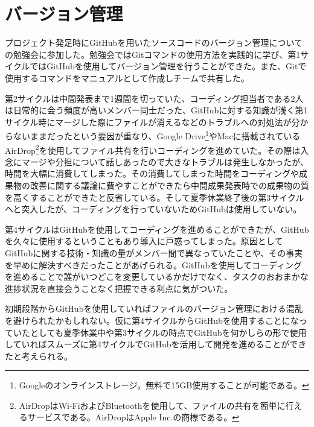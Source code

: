 \section{バージョン管理}
プロジェクト発足時にGitHubを用いたソースコードのバージョン管理についての勉強会に参加した。勉強会ではGitコマンドの使用方法を実践的に学び、第1サイクルではGitHubを使用してバージョン管理を行うことができた。また、Gitで使用するコマンドをマニュアルとして作成しチームで共有した。
\par 第2サイクルは中間発表まで1週間を切っていた、コーディング担当者である2人は日常的に会う頻度が高いメンバー同士だった、GitHubに対する知識が浅く第1サイクル時にマージした際にファイルが消えるなどのトラブルへの対処法が分からないままだったという要因が重なり、Google Drive\footnote{Googleのオンラインストレージ。無料で15GB使用することが可能である。}やMacに搭載されているAirDrop\footnote{AirDropはWi-FiおよびBluetoothを使用して、ファイルの共有を簡単に行えるサービスである。AirDropはApple Inc.の商標である。}を使用してファイル共有を行いコーディングを進めていた。その際は入念にマージや分担について話しあったので大きなトラブルは発生しなかったが、時間を大幅に消費してしまった。その消費してしまった時間をコーディングや成果物の改善に関する議論に費やすことができたら中間成果発表時での成果物の質を高くすることができたと反省している。そして夏季休業終了後の第3サイクルへと突入したが、コーディングを行っていないためGitHubは使用していない。
\par 第4サイクルはGitHubを使用してコーディングを進めることができたが、GitHubを久々に使用するということもあり導入に戸惑ってしまった。原因としてGitHubに関する技術・知識の量がメンバー間で異なっていたことや、その事実を早めに解決すべきだったことがあげられる。GitHubを使用してコーディングを進めることで誰がいつどこを変更しているかだけでなく、タスクのおおまかな進捗状況を直接会うことなく把握できる利点に気がついた。
\par  初期段階からGitHubを使用していればファイルのバージョン管理における混乱を避けられたかもしれない。仮に第4サイクルからGitHubを使用することになっていたとしても夏季休業中や第3サイクルの時点でGitHubを何かしらの形で使用していればスムーズに第4サイクルでGitHubを活用して開発を進めることができたと考えられる。
